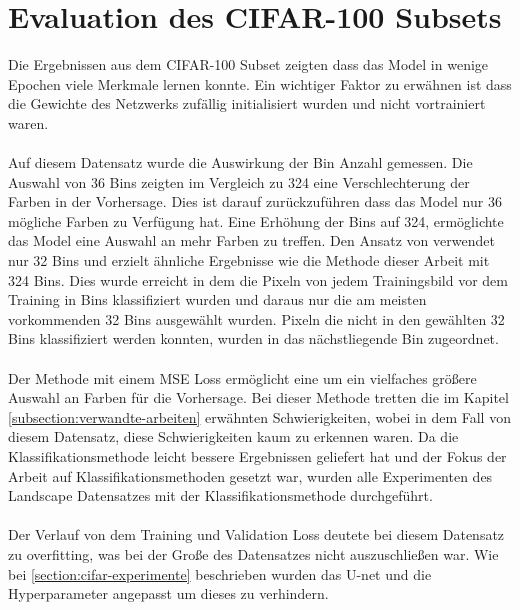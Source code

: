 \section{Evaluation des CIFAR-100 Subsets}
Die Ergebnissen aus dem CIFAR-100 Subset zeigten dass das Model in wenige Epochen viele Merkmale lernen konnte. Ein wichtiger Faktor zu 
erwähnen ist dass die Gewichte des Netzwerks zufällig initialisiert wurden und nicht vortrainiert waren. 
\\
\\
Auf diesem Datensatz wurde die Auswirkung der Bin Anzahl gemessen. Die Auswahl von 36 Bins zeigten im Vergleich zu 324 eine 
Verschlechterung der Farben in der Vorhersage. Dies ist darauf zurückzuführen dass das Model nur 36 mögliche Farben zu Verfügung hat.
Eine Erhöhung der Bins auf 324, ermöglichte das Model eine Auswahl an mehr Farben zu treffen. 
Den Ansatz von \cite{billaut2018colorunet} verwendet nur 32 Bins und erzielt ähnliche Ergebnisse wie die Methode dieser Arbeit mit 324 Bins.
Dies wurde erreicht in dem die Pixeln von jedem Trainingsbild vor dem Training in Bins klassifiziert wurden und daraus nur die am meisten
vorkommenden 32 Bins ausgewählt wurden. Pixeln die nicht in den gewählten 32 Bins klassifiziert werden konnten, wurden in das nächstliegende Bin
zugeordnet.
\\
\\
Der Methode mit einem MSE Loss ermöglicht eine um ein vielfaches größere Auswahl an Farben für die Vorhersage. Bei dieser Methode tretten 
die im Kapitel \ref{subsection:verwandte-arbeiten} erwähnten Schwierigkeiten, wobei in dem Fall von diesem Datensatz, diese Schwierigkeiten
kaum zu erkennen waren.
Da die Klassifikationsmethode leicht bessere Ergebnissen geliefert hat und der Fokus der Arbeit auf Klassifikationsmethoden gesetzt war,
wurden alle Experimenten des Landscape Datensatzes mit der Klassifikationsmethode durchgeführt.
\\
\\
Der Verlauf von dem Training und Validation Loss deutete bei diesem Datensatz zu overfitting, was bei der Große des Datensatzes nicht auszuschließen war.
Wie bei \ref{section:cifar-experimente} beschrieben wurden das U-net und die Hyperparameter angepasst um dieses zu verhindern.

